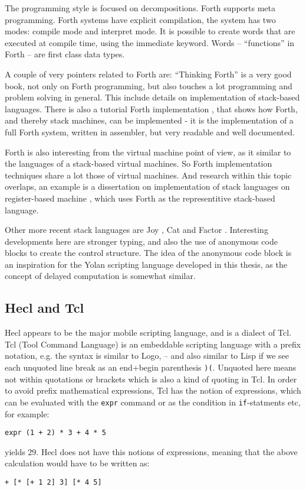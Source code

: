 \documentclass[11pt]{report}
\begin{document}
The programming style is focused on decompositions. Forth supports meta programming.
Forth systems have explicit compilation, the system has two modes: compile mode and interpret mode. 
It is possible to create words that are executed at compile time, using the immediate keyword.
Words -- ``functions'' in Forth -- are first class data types.

A couple of very pointers related to Forth are: 
``Thinking Forth'' is a very good book, not only on Forth programming, but also touches a lot programming and problem solving in general. This include details on implementation of stack-based languages.
There is also a tutorial Forth implementation \cite{jonesforth}, that shows how Forth, and thereby stack machines, can be implemented - it is the implementation of a full Forth system, written in assembler, but very readable and well documented.

Forth is also interesting from the virtual machine point of view, as it similar to the languages of a stack-based virtual machines. So Forth implementation techniques share a lot those of virtual machines. And research within this topic overlaps, an example is a dissertation on implementation of stack languages on register-based machine \cite{ertl-dissertation}, which uses Forth as the representitive stack-based language.

Other more recent stack languages are Joy \cite{joy-language}, Cat \cite{cat-language} and Factor \cite{factor-language}.
Interesting developments here are stronger typing, and also the use of anonymous code blocks to create the control structure.
The idea of the anonymous code block is an inspiration for the Yolan scripting language developed in this thesis, as the concept of delayed computation is somewhat similar.


\subsection{Hecl and Tcl}
Hecl appears to be the major mobile scripting language, and is a dialect of Tcl. 
Tcl (Tool Command Language) is an embeddable scripting language \cite{tclbook} with a prefix notation, e.g. the syntax is similar to Logo, -- and also similar to Lisp if we see each unquoted line break as an end+begin parenthesis \verb|)(|. Unquoted here means not within quotations or brackets which is also a kind of quoting in Tcl.
In order to avoid prefix mathematical expressions, Tcl has the notion of expressions, which can be evaluated with the \verb|expr| command or as the condition in \verb|if|-statments etc, for example:
\begin{verbatim}
expr (1 + 2) * 3 + 4 * 5
\end{verbatim}
yields 29. Hecl does not have this notions of expressions, meaning that the above calculation would have to be written as:
\begin{verbatim}
+ [* [+ 1 2] 3] [* 4 5]
\end{verbatim}
\end{document}
